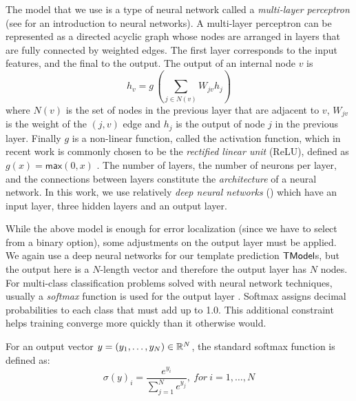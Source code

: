 The model that we use is a type of neural network called a \emph{multi-layer
perceptron} (see \citep{Nielsen2015-pu} for an introduction to neural networks).
A multi-layer perceptron can be represented as a directed acyclic graph whose
nodes are arranged in layers that are fully connected by weighted edges. The
first layer corresponds to the input features, and the final to the output. The
output of an internal node $v$ is
\[ h_v = g\,(\sum_{j \in N(v)}\!W_{jv} h_j ) \] where $N(v)$ is the set of nodes
in the previous layer that are adjacent to $v$, $W_{jv}$ is the weight of the
$(j, v)$ edge and $h_j$ is the output of node $j$ in the previous layer. Finally
$g$ is a non-linear function, called the activation function, which in recent
work is commonly chosen to be the \emph{rectified linear unit} (ReLU), defined
as $g(x) = \mathsf{max}(0,x)$ \citep{Nair2010-xg}. The number of layers, the
number of neurons per layer, and the connections between layers constitute the
\emph{architecture} of a neural network. In this work, we use relatively
\emph{deep neural networks} (\dnn) which have an input layer, three hidden
layers and an output layer.


While the above model is enough for error localization (since we have to select
from a binary option), some adjustments on the output layer must be applied. We
again use a deep neural networks for our template prediction $\mathsf{TModel}$s, but the
output here is a $N$-length vector and therefore the output layer has $N$ nodes.
For multi-class classification problems solved with neural network techniques,
usually a \emph{softmax} function is used for the output layer
\citep{Goodfellow-et-al-2016, Bishop-book-2006}. Softmax assigns decimal
probabilities to each class that must add up to 1.0. This additional constraint
helps training converge more quickly than it otherwise would.

For an output vector $y = (y_1, \dots, y_N) \in \mathbb{R}^{N}$, the standard softmax
function is defined as:
\[ \sigma(y)_i = \frac{e^{y_i}}{\sum_{j=1}^{N} e^{y_j}},\ for\ i = 1, \dots, N \]


